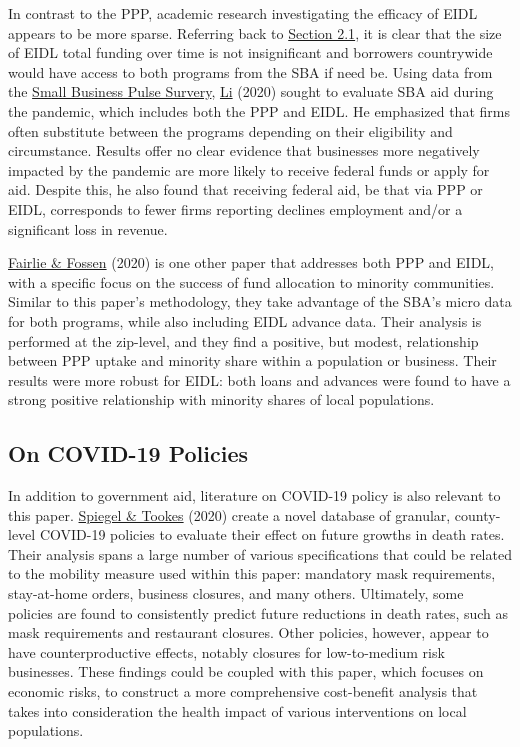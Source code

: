 \documentclass[11pt]{article} %
\begin{document}
In contrast to the PPP, academic research investigating the efficacy of EIDL appears to be more sparse. Referring back to \hyperlink{Section 2.1}{Section 2.1}, it is clear that the size of EIDL total funding over time is not insignificant and borrowers countrywide would have access to both programs from the SBA if need be. Using data from the \href{https://www.census.gov/data/experimental-data-products/small-business-pulse-survey.html}{Small Business Pulse Survery}, \hyperlink{Meng}{Li} (2020) sought to evaluate SBA aid during the pandemic, which includes both the PPP and EIDL. He emphasized that firms often substitute between the programs depending on their eligibility and circumstance. Results offer no clear evidence that businesses more negatively impacted by the pandemic are more likely to receive federal funds or apply for aid. Despite this, he also found that receiving federal aid, be that via PPP or EIDL, corresponds to fewer firms reporting declines employment and/or a significant loss in revenue. 

\hyperlink{Fairlie}{Fairlie \& Fossen} (2020) is one other paper that addresses both PPP and EIDL, with a specific focus on the success of fund allocation to minority communities. Similar to this paper's methodology, they take advantage of the SBA's micro data for both programs, while also including EIDL advance data. Their analysis is performed at the zip-level, and they find a positive, but modest, relationship between PPP uptake and minority share within a population or business. Their results were more robust for EIDL: both loans and advances were found to have a strong positive relationship with minority shares of local populations.  

\subsection{On COVID-19 Policies}

In addition to government aid, literature on COVID-19 policy is also relevant to this paper. \hyperlink{Spiegel}{Spiegel \& Tookes} (2020) create a novel database of granular, county-level COVID-19 policies to evaluate their effect on future growths in death rates. Their analysis spans a large number of various specifications that could be related to the mobility measure used within this paper: mandatory mask requirements, stay-at-home orders, business closures, and many others. Ultimately, some policies are found to consistently predict future reductions in death rates, such as mask requirements and restaurant closures. Other policies, however, appear to have counterproductive effects, notably closures for low-to-medium risk businesses. These findings could be coupled with this paper, which focuses on economic risks, to construct a more comprehensive cost-benefit analysis that takes into consideration the health impact of various interventions on local populations.
\end{document}
